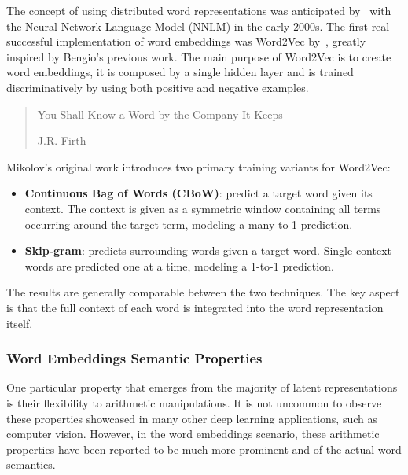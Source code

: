 The concept of using distributed word representations was anticipated by~\citet{bengio2000} with the Neural Network Language Model (NNLM) in the early 2000s.
The first real successful implementation of word embeddings was Word2Vec by~\citet{mikolov2013}, greatly inspired by Bengio's previous work.
The main purpose of Word2Vec is to create word embeddings, it is composed by a single hidden layer and is trained discriminatively by using both positive and negative examples.

\blockquote[J.R. Firth]{You Shall Know a Word by the Company It Keeps}

\begin{figure}[t!]
    \centering
    \quad
    \caption{}
    \label{fig:background_word2vec-cbow_word2vec-skipg}
\end{figure}

Mikolov's original work introduces two primary training variants for Word2Vec:
\begin{itemize}
    \item \textbf{Continuous Bag of Words (CBoW)}: predict a target word given its context.
The context is given as a symmetric window containing all terms occurring around the target term, modeling a many-to-1 prediction.
    \item \textbf{Skip-gram}: predicts surrounding words given a target word.
Single context words are predicted one at a time, modeling a 1-to-1 prediction.
\end{itemize}
The results are generally comparable between the two techniques.
The key aspect is that the full context of each word is integrated into the word representation itself.

\subsubsection*{Word Embeddings Semantic Properties}

One particular property that emerges from the majority of latent representations is their flexibility to arithmetic manipulations.
It is not uncommon to observe these properties showcased in many other deep learning applications, such as computer vision.
However, in the word embeddings scenario, these arithmetic properties have been reported to be much more prominent and  of the actual word semantics.


